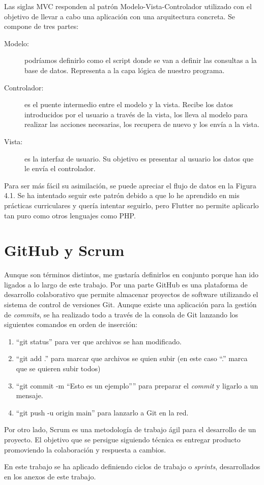 	Las siglas MVC responden al patrón Modelo-Vista-Controlador utilizado con el objetivo de llevar a cabo una aplicación con una arquitectura concreta. Se compone de tres partes:
	\begin{description}
		\item [Modelo:] podríamos definirlo como el script donde se van a definir las consultas a la base de datos. Representa a la capa lógica de nuestro programa.
		\item [Controlador:] es el puente intermedio entre el modelo y la vista. Recibe los datos introducidos por el usuario a través de la vista, los lleva al modelo para realizar las acciones necesarias, los recupera de nuevo y los envía a la vista.
		\item [Vista:] es la interfaz de usuario. Su objetivo es presentar al usuario los datos que le envía el controlador.
	\end{description}
	
	Para ser más fácil su asimilación, se puede apreciar el flujo de datos en la Figura 4.1. Se ha intentado seguir este patrón debido a que lo he aprendido en mis prácticas curriculares y quería intentar seguirlo, pero Flutter no permite aplicarlo tan puro como otros lenguajes como PHP.
	

\section{GitHub y Scrum}

	Aunque son términos distintos, me gustaría definirlos en conjunto porque han ido ligados a lo largo de este trabajo. Por una parte GitHub es una plataforma de desarrollo colaborativo que permite almacenar proyectos de software utilizando el sistema de control de versiones Git. Aunque existe una aplicación para la gestión de \emph{commits}, se ha realizado todo a través de la consola de Git lanzando los siguientes comandos en orden de inserción:
	\begin{enumerate}
		\item ``git status'' para ver que archivos se han modificado.
		\item ``git add .'' para marcar que archivos se quien subir (en este caso ``.'' marca que se quieren subir todos)
		\item ``git commit -m ``Esto es un ejemplo'''' para preparar el \emph{commit} y ligarlo a un mensaje.
		\item ``git push -u origin main'' para lanzarlo a Git en la red.
	\end{enumerate}
	
	Por otro lado, Scrum es una metodología de trabajo ágil para el desarrollo de un proyecto. El objetivo que se persigue siguiendo técnica es entregar producto promoviendo la colaboración y respuesta a cambios.
	
	En este trabajo se ha aplicado definiendo ciclos de trabajo o \emph{sprints}, desarrollados en los anexos de este trabajo.
